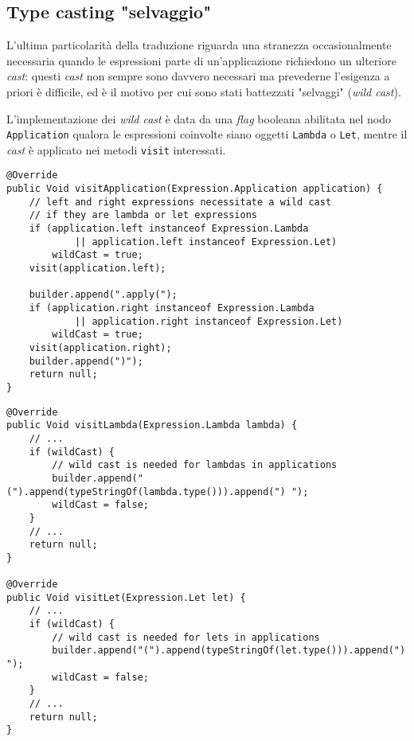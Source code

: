 \subsection{Type casting "selvaggio"}
\label{sec:5-15-wild-type-casting}

L'ultima particolarità della traduzione riguarda una stranezza occasionalmente necessaria quando
le espressioni parte di un'applicazione richiedono un ulteriore \textit{cast}: questi \textit{cast} non sempre sono davvero necessari
ma prevederne l'esigenza a priori è difficile, ed è il motivo per cui sono stati battezzati "selvaggi" (\textit{wild cast}).


L'implementazione dei \textit{wild cast} è data da una \textit{flag} booleana abilitata nel nodo \texttt{Application}
qualora le espressioni coinvolte siano oggetti \texttt{Lambda} o \texttt{Let}, mentre il \textit{cast} è applicato
nei metodi \texttt{visit} interessati.

\vspace{4mm}
\begin{lstlisting}[caption={Metodo \texttt{visit} per le applicazioni di funzioni}, style=javaCode, label={lst:5-15-visit-application-java}]
@Override
public Void visitApplication(Expression.Application application) {
    // left and right expressions necessitate a wild cast
    // if they are lambda or let expressions
    if (application.left instanceof Expression.Lambda
            || application.left instanceof Expression.Let)
        wildCast = true;
    visit(application.left);

    builder.append(".apply(");
    if (application.right instanceof Expression.Lambda
            || application.right instanceof Expression.Let)
        wildCast = true;
    visit(application.right);
    builder.append(")");
    return null;
}
\end{lstlisting}
\vspace{4mm}
\begin{lstlisting}[caption={\textit{Wild cast} in espressioni \texttt{lambda} e \texttt{let}}, style=javaCode, label={lst:5-15-wild-casts-java}]
@Override
public Void visitLambda(Expression.Lambda lambda) {
    // ...
    if (wildCast) {
        // wild cast is needed for lambdas in applications
        builder.append("(").append(typeStringOf(lambda.type())).append(") ");
        wildCast = false;
    }
    // ...
    return null;
}

@Override
public Void visitLet(Expression.Let let) {
    // ...
    if (wildCast) {
        // wild cast is needed for lets in applications
        builder.append("(").append(typeStringOf(let.type())).append(") ");
        wildCast = false;
    }
    // ...
    return null;
}
\end{lstlisting}


